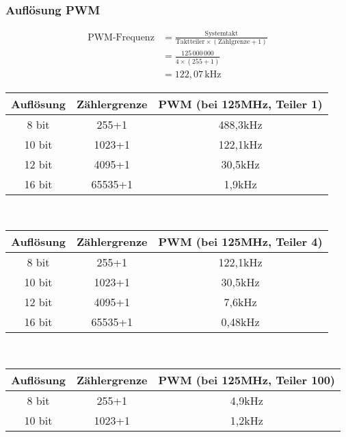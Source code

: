\documentclass[a4paper,12pt,twoside]{article}
\begin{document}
\subsubsection{Auflösung PWM}
\begin{align}
	\text{PWM-Frequenz} & = \frac{\text{Systemtakt}}{\text{Taktteiler} \times (\text{Zählgrenze} + 1)} \\
	                    & = \frac{125\,000\,000}{4 \times (255 + 1)}                                   \\
	                    & = 122{,}07\,\text{kHz}
\end{align}
\begin{center}
	\begin{tabular}{|c|c|c|}
		\hline
		Auflösung & Zählergrenze & PWM (bei 125MHz, \textbf{Teiler 1}) \\
		\hline
		\hline
		8 bit     & 255+1        & 488,3kHz                            \\
		\hline
		10 bit    & 1023+1       & 122,1kHz                            \\
		\hline
		12 bit    & 4095+1       & 30,5kHz                             \\
		\hline
		16 bit    & 65535+1      & 1,9kHz                              \\
		\hline
	\end{tabular}
	\\[10mm]
	\begin{tabular}{|c|c|c|}
		\hline
		Auflösung & Zählergrenze & PWM (bei 125MHz, \textbf{Teiler 4}) \\
		\hline
		\hline
		8 bit     & 255+1        & 122,1kHz                            \\
		\hline
		10 bit    & 1023+1       & 30,5kHz                             \\
		\hline
		12 bit    & 4095+1       & 7,6kHz                              \\
		\hline
		16 bit    & 65535+1      & 0,48kHz                             \\
		\hline
	\end{tabular}
	\\[10mm]
	\begin{tabular}{|c|c|c|}
		\hline
		Auflösung & Zählergrenze & PWM (bei 125MHz, \textbf{Teiler 100}) \\
		\hline
		\hline
		8 bit     & 255+1        & 4,9kHz                                \\
		\hline
		10 bit    & 1023+1       & 1,2kHz                                \\

\end{tabular}
\end{center}
\end{document}
